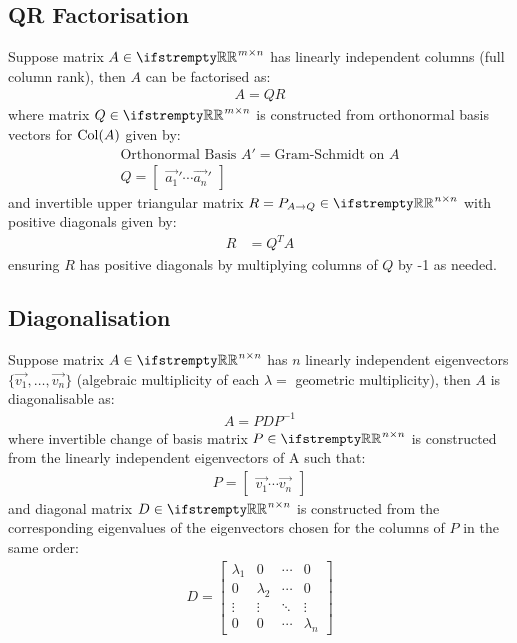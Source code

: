 \documentclass[12pt, a4paper]{article}
\begin{document}
\begin{multicols*}{3}
\subsection{QR Factorisation}
Suppose matrix $A \in \RR^{m{\times}n}$ has linearly independent columns (full column rank), then $A$ can be factorised as:
\begin{align*}
  A = QR
\end{align*}
where matrix $Q \in \RR^{m{\times}n}$ is constructed from orthonormal basis vectors for $\operatorname{Col}(A)$ given by:
\begin{gather*}
  \text{Orthonormal Basis }A' = \text{Gram-Schmidt on } A \\
  Q = \begin{bmatrix}\vec{a_1}' \cdots \vec{a_n}'\end{bmatrix}
\end{gather*}
and invertible upper triangular matrix $R = P_{A\rightarrow Q} \in \RR^{n{\times}n}$ with positive diagonals given by:
\begin{align*}
  R &= Q^TA
\end{align*}
ensuring $R$ has positive diagonals by multiplying columns of $Q$ by -1 as needed.
\colbreak

\subsection{Diagonalisation}
Suppose matrix $A \in \RR^{n{\times}n}$ has $n$ linearly independent eigenvectors $\{\vec{v_1},\ldots,\vec{v_n}\}$ (algebraic multiplicity of each $\lambda =$ geometric multiplicity), then $A$ is diagonalisable as:
\begin{align*}
  A = PDP^{-1}
\end{align*}
where invertible change of basis matrix $P \in \RR^{n{\times}n}$ is constructed from the linearly independent eigenvectors of A such that:
\begin{align*}
  P = \begin{bmatrix}\vec{v_1} \cdots \vec{v_n}\end{bmatrix}
\end{align*}
and diagonal matrix $D \in \RR^{n{\times}n}$ is constructed from the corresponding eigenvalues of the eigenvectors chosen for the columns of $P$ in the same order:
\begin{align*}
  D = \begin{bmatrix}\lambda_1 & 0 & \cdots & 0\\ 0 & \lambda_2 & \cdots & 0\\ \vdots & \vdots & \ddots & \vdots \\ 0 & 0 & \cdots & \lambda_n \end{bmatrix}
\end{align*}


\end{multicols*}
\end{document}
